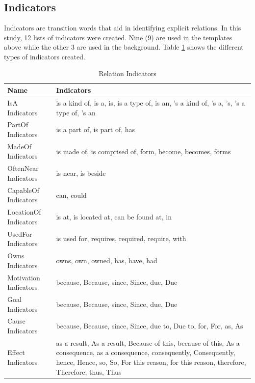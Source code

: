 \subsection{Indicators}
\label{sec:indicators}

Indicators are transition words that aid in identifying explicit relations. In this study, 12 lists of indicators were created. Nine (9) are used in the templates above while the other 3 are used in the background. Table \ref{tab:indicators} shows the different types of indicators created.

\begin{table}[H]   %
\centering
\caption{Relation Indicators} \vspace{0.25em}
\begin{tabular}{|p{3.5cm}|p{10cm}|} \hline
Name & Indicators \\ \hline
IsA Indicators				& is a kind of, is a, is, is a type of, is an, 's a kind of, 's a, 's, 's a type of, 's an \\ \hline
PartOf Indicators			& is a part of, is part of, has \\ \hline
MadeOf Indicators			& is made of, is comprised of, form, become, becomes, forms \\ \hline
OftenNear Indicators		& is near, is beside \\ \hline
CapableOf Indicators		& can, could \\ \hline
LocationOf Indicators		& is at, is located at, can be found at, in \\ \hline
UsedFor Indicators			& is used for, requires, required, require, with \\ \hline
Owns Indicators 			& owns, own, owned, has, have, had \\ \hline
Motivation Indicators		& because, Because, since, Since, due, Due \\ \hline
Goal Indicators				& because, Because, since, Since, due, Due \\ \hline
Cause Indicators			& because, Because, since, Since, due to, Due to, for, For, as, As \\ \hline
Effect Indicators			& as a result, As a result, Because of this, because of this, As a consequence, as a consequence, consequently, Consequently, hence, Hence, so, So, For this reason, for this reason, therefore, Therefore, thus, Thus \\ \hline
\end{tabular}
\label{tab:indicators}
\end{table}

